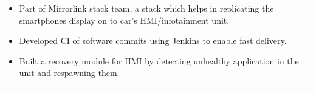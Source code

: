 \documentclass[11pt,a4paper]{article}
\begin{document}
\begin{itemize}
    \begin{itemize}[label=\textbullet]
      \itemsep0em
      \item Part of Mirrorlink stack team, a stack which helps in replicating the
smartphones display on to car’s HMI/infotainment unit.
      \item Developed CI of software commits using Jenkins to enable fast delivery. 
      \item Built a recovery module for HMI by detecting unhealthy application in the unit and respawning them.
    \end{itemize}

  \end{itemize}



\hrule
\vspace{-1.0em}
\end{document}
